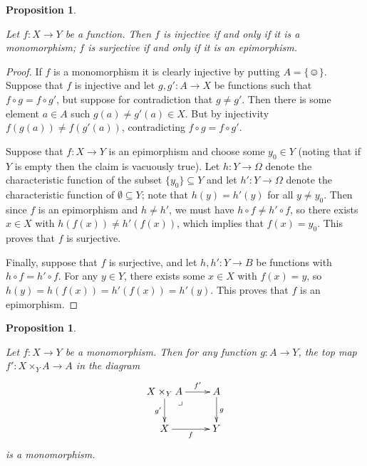 \documentclass{book}
\makeatletter
\def\singleton{\{\smiley\}}
\def\to{\rightarrow}
\def\taking{\colon}
\def\ss{\subseteq}
\def\ullimit{\ar@{}[rd]|(.3)*+{\lrcorner}}
\newtheorem{proposition}[subsubsection]{Proposition}
\theoremstyle{remark}
\theoremstyle{definition}
\makeatother
\begin{document}
\begin{proposition}\label{prop:inj and surj}

Let $f\taking X\to Y$ be a function. Then $f$ is injective if and only if it is a monomorphism; $f$ is surjective if and only if it is an epimorphism.

\end{proposition}

\begin{proof}

If $f$ is a monomorphism it is clearly injective by putting $A=\singleton$. Suppose that $f$ is injective and let $g,g'\taking A\to X$ be functions such that $f\circ g=f\circ g'$, but suppose for contradiction that $g\neq g'$. Then there is some element $a\in A$ such $g(a)\neq g'(a)\in X$. But by injectivity $f(g(a))\neq f(g'(a))$, contradicting $f\circ g=f\circ g'$.

Suppose that $f\taking X\to Y$ is an epimorphism and choose some $y_0\in Y$ (noting that if $Y$ is empty then the claim is vacuously true). Let $h\taking Y\to\Omega$ denote the characteristic function of the subset $\{y_0\}\ss Y$ and let $h'\taking Y\to\Omega$ denote the characteristic function of $\emptyset\ss Y$; note that $h(y)=h'(y)$ for all $y\neq y_0$. Then since $f$ is an epimorphism and $h\neq h'$, we must have $h\circ f\neq h'\circ f$, so there exists $x\in X$ with $h(f(x))\neq h'(f(x))$, which implies that $f(x)=y_0$. This proves that $f$ is surjective.

Finally, suppose that $f$ is surjective, and let $h,h'\taking Y\to B$ be functions with $h\circ f=h'\circ f$. For any $y\in Y$, there exists some $x\in X$ with $f(x)=y$, so $h(y)=h(f(x))=h'(f(x))=h'(y)$. This proves that $f$ is an epimorphism.

\end{proof}

\begin{proposition}\label{prop:pb preserve mono}

Let $f\taking X\to Y$ be a monomorphism. Then for any function $g\taking A\to Y$, the top map $f'\taking X\times_YA\to A$ in the diagram
$$
\xymatrix{X\times_YA\ar[r]^-{f'}\ar[d]_{g'}\ullimit&A\ar[d]^g\\X\ar[r]_f&Y}
$$
is a monomorphism.

\end{proposition}
\end{document}
